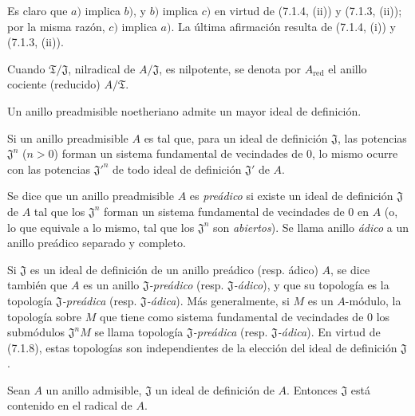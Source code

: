 Es claro que $a)$ implica $b)$, y $b)$ implica $c)$ en virtud de
(7.1.4, (ii)) y (7.1.3, (ii)); por la misma razón, $c)$ implica $a)$. La
última afirmación resulta de (7.1.4, (i)) y (7.1.3, (ii)).

Cuando $\mathfrak T/\mathfrak J$, nilradical de $A/\mathfrak J$, es
nilpotente, se denota por $A_{\mathrm{red}}$ el anillo cociente (reducido)
$A/\mathfrak T$.


\begin{corollary}[7.1.7]
\label{0.7.1.7-fr}
Un anillo preadmisible noetheriano admite un mayor ideal de definición.
\end{corollary}

\begin{corollary}[7.1.8]
\label{0.7.1.8-fr}
Si un anillo preadmisible $A$ es tal que, para un ideal de definición
$\mathfrak J$, las potencias $\mathfrak J^n$ ($n>0$) forman un sistema
fundamental de vecindades de $0$, lo mismo ocurre con las potencias
${\mathfrak J'}^n$ de todo ideal de definición $\mathfrak J'$ de $A$.
\end{corollary}

\begin{definition}[7.1.9]
\label{0.7.1.9-fr}
Se dice que un anillo preadmisible $A$ es \emph{preádico} si existe un ideal de
definición $\mathfrak J$ de $A$ tal que los $\mathfrak J^n$ forman un sistema
fundamental de vecindades de $0$ en $A$ \textup{(o, lo que equivale a lo mismo, tal que
los $\mathfrak J^n$ son \emph{abiertos})}. Se llama anillo \emph{ádico} a un anillo
preádico separado y completo.
\end{definition}

Si $\mathfrak J$ es un ideal de definición de un anillo preádico (resp.
ádico) $A$, se dice también que $A$ es un anillo
\emph{$\mathfrak J$-preádico} (resp. \emph{$\mathfrak J$-ádico}), y que su
topología es la topología \emph{$\mathfrak J$-preádica} (resp.
\emph{$\mathfrak J$-ádica}). Más generalmente, si $M$ es un $A$-módulo, la
topología sobre $M$ que tiene como sistema fundamental de vecindades de $0$ los
submódulos $\mathfrak J^nM$ se llama topología
\emph{$\mathfrak J$-preádica} (resp. \emph{$\mathfrak J$-ádica}). En virtud
de (7.1.8), estas topologías son independientes de la elección del ideal de definición
$\mathfrak J$.

\begin{proposition}[7.1.10]
\label{0.7.1.10-fr}
Sean $A$ un anillo admisible, $\mathfrak J$ un ideal de definición de $A$.
Entonces $\mathfrak J$ está contenido en el radical de $A$.
\end{proposition}


